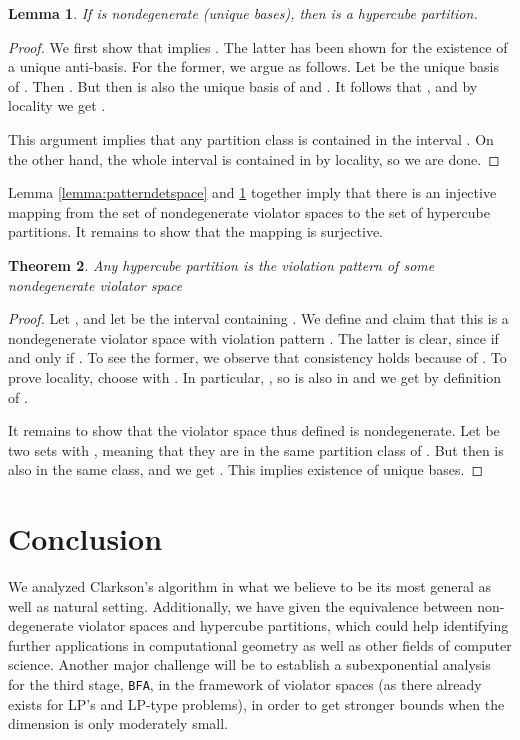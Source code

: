 \documentclass[12pt]{article}
\newtheorem{theorem2}{Theorem}[section]
\newenvironment{theorem}{\begin{theorem2}}{\end{theorem2}}
\newtheorem{lemma2}[theorem2]{Lemma}
\newenvironment{lemma}{\begin{lemma2}}{\end{lemma2}}
\theoremstyle{remark}
\def\stageIII{\texttt{BFA}}
\begin{document}
\begin{lemma}
\label{lemma:nondegdetpartition}
If  is nondegenerate (unique bases), then  is a hypercube
partition. 
\end{lemma}

\begin{proof}
We first show that  implies . The latter has been shown for the existence of a unique
anti-basis. For the former, we argue as follows. Let  be the unique
basis of . Then . But then  is also the
unique basis of  and . It follows that ,
and by locality we get .

This argument implies that any partition class  is contained
in the interval
.
On the other hand, the whole interval is contained in  by locality,
so we are done. 
\end{proof}

Lemma \ref{lemma:patterndetspace} and  \ref{lemma:nondegdetpartition}
together imply that there is an injective mapping 
from the set of nondegenerate violator spaces to the set of hypercube
partitions. It remains to show that the mapping is surjective.

\begin{theorem}
Any hypercube partition  is the violation pattern
of some nondegenerate violator space 
 \end{theorem}
\begin{proof}
Let , and let  be the interval containing
. We define  and claim that this is a
nondegenerate violator space with violation pattern . The
latter is clear, since  if and only if . To see the former, we observe that consistency holds because
of . To prove locality, choose  with
. In particular, , so  is also in  and we get  by definition
of .

It remains to show that the violator space thus defined is nondegenerate.
Let  be two sets with , meaning that they are in the
same partition class of . But then  is also in the
same class, and we get . This implies existence of
unique bases.
\end{proof}

\section{Conclusion}
We analyzed Clarkson's algorithm
in what we believe to be its most general as well as natural
setting. Additionally, we have given the equivalence between non-degenerate violator
spaces and hypercube partitions, which could help 
identifying further applications in computational geometry as well as other fields
of computer science. Another major challenge will be to establish
a subexponential analysis for the third stage, \stageIII, in the framework of violator spaces
(as there already exists for LP's and LP-type problems), in order
to get stronger bounds when the dimension is only moderately small.
\end{document}
